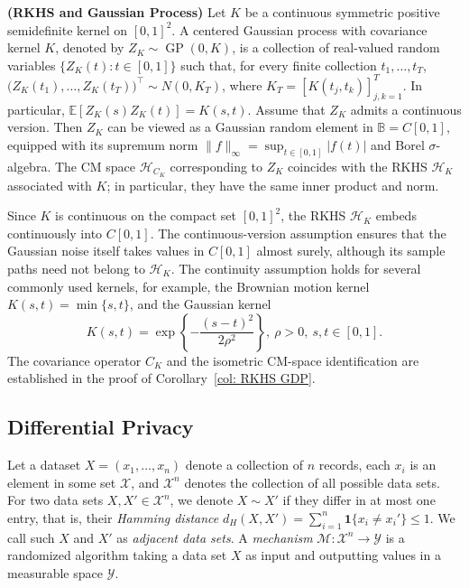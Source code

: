 \documentclass[twoside,11pt]{article}
\newcommand{\Set}[1]{\left\{{#1}\right\}} %
\begin{document}
\begin{example}\textup{\textbf{(RKHS and Gaussian Process)}}
\label{ex: RKHS CM}
Let $K$ be a continuous symmetric positive semidefinite kernel on $[0,1]^2$. A centered Gaussian process with covariance kernel $K$, denoted by $Z_K\sim\operatorname{GP}(0,K)$, is a collection of real-valued random variables $\{Z_K(t):t\in[0,1]\}$ such that, for every finite collection $t_1,\ldots,t_T$, $\bigl(Z_K(t_1),\ldots,Z_K(t_T)\bigr)^\top \sim N(0,K_T)$, where $K_T=[K(t_j,t_k)]_{j,k=1}^T$. In particular, $\mathbb E[Z_K(s)Z_K(t)]=K(s,t)$. Assume that $Z_K$ admits a continuous version. Then $Z_K$ can be viewed as a Gaussian random element in $\mathbb B=C[0,1]$, equipped with its supremum norm $\|f\|_\infty = \sup_{t\in [0,1]} |f(t)|$ and Borel $\sigma$-algebra. The CM space $\mathcal{H}_{C_K}$ corresponding to $Z_K$ coincides with the RKHS $\mathcal{H}_K$ associated with $K$; in particular, they have the same inner product and norm.
\end{example}

Since $K$ is continuous on the compact set $[0,1]^2$, the RKHS $\mathcal H_K$ embeds continuously into $C[0,1]$. The continuous-version assumption ensures that the Gaussian noise itself takes values in $C[0,1]$ almost surely, although its sample paths need not belong to $\mathcal H_K$. The continuity assumption holds for several commonly used kernels, for example, the Brownian motion kernel $K(s,t)=\min\{s,t\}$, and the Gaussian kernel
\begin{equation}
\label{eq: Gaussian kernel}
K(s,t) = \exp\Set{-\dfrac{(s-t)^2}{2\rho^2}},\ \rho>0,\ s,t\in [0,1].
\end{equation}
The covariance operator $C_K$ and the isometric CM-space identification are established in the proof of Corollary~\ref{col: RKHS GDP}. 

\subsection{Differential Privacy}
\label{subsec: Differential Privacy}
Let a dataset $X=(x_1,\ldots,x_n)$ denote a collection of $n$ records, each $x_i$ is an element in some set $\mathcal{X}$, and $\mathcal{X}^n$ denotes the collection of all possible data sets. For two data sets $X, X' \in \mathcal{X}^n$, we denote $X\sim X'$ if they differ in at most one entry, that is, their \emph{Hamming distance} $d_H(X,X') = \sum_{i=1}^n \mathbf{1}\{x_i\neq x_i'\}\leq 1$. We call such $X$ and $X'$ as \emph{adjacent data sets}. A \emph{mechanism} $\mathcal{M}: \mathcal{X}^n\to \mathcal{Y}$ is a randomized algorithm taking a data set $X$ as input and outputting values in a measurable space $\mathcal{Y}$. 
\end{document}
